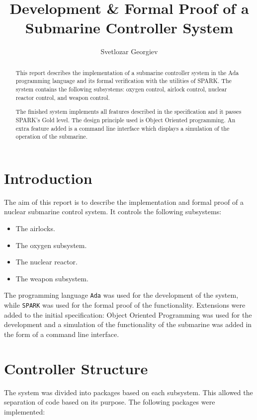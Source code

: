 \documentclass{llncs}
\begin{document}
\author{Svetlozar Georgiev}
\title{Development \& Formal Proof of a Submarine Controller System}

\maketitle

\begin{abstract}
	This report describes the implementation of a submarine controller system in the Ada programming language and its formal verification with the utilities of SPARK. The system contains the following subsystems: oxygen control, airlock control, nuclear reactor control, and weapon control. 
	
	The finished system implements all features described in the specification and it passes SPARK's Gold level. The design principle used is Object Oriented programming. An extra feature added is a command line interface which displays a simulation of the operation of the submarine. 
\end{abstract}

\section{Introduction}
The aim of this report is to describe the implementation and formal proof of a nuclear submarine control system. It controls the following subsystems:

\begin{itemize}
	\item The airlocks.
	\item The oxygen subsystem.
	\item The nuclear reactor.
	\item The weapon subsystem.
\end{itemize}

The programming language \texttt{Ada} was used for the development of the system, while \texttt{SPARK} was used for the formal proof of the functionality. Extensions were added to the initial specification: Object Oriented Programming was used for the development and a simulation of the functionality of the submarine was added in the form of a command line interface.

\section{Controller Structure}
The system was divided into packages based on each subsystem. This allowed the separation of code based on its purpose. The following packages were implemented: 
\end{document}
